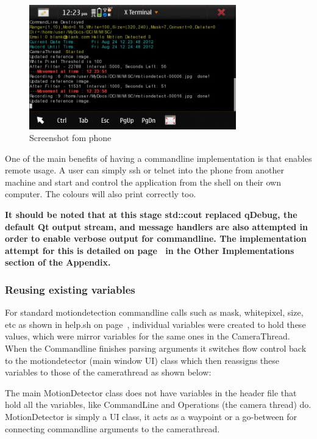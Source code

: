 {\begin{figure}[H]
	\vspace{-10pt}
	\begin{center}
		\includegraphics[width=0.8\textwidth]{../images/commandline/commandscreen.jpg}
	\end{center}
	\vspace{-20pt}
	\caption{Screenshot fom phone}
	\label{img:command}
	\vspace{-10pt}
\end{figure}

One of the main benefits of having a commandline implementation is that enables remote usage. A user can simply ssh or telnet into the phone from another machine and start and control the application from the shell on their own computer. The colours will also print correctly too.

{\small\bf It should be noted that at this stage std::cout replaced qDebug, the default Qt output stream, and message handlers are also attempted in order to enable verbose output for commandline. The implementation attempt for this is detailed on page~\pageref{qdebug} in the Other Implementations section of the Appendix.}

}
\subsubsection{Reusing existing variables}

For standard motiondetection commandline calls such as mask, whitepixel, size, etc as shown in help.sh on page~\pageref{frame:help}, individual variables were created to hold these values, which were mirror variables for the same ones in the CameraThread. When the Commandline finishes parsing arguments it switches flow control back to the motiondetector (main window UI) class which then reassigns these variables to those of the camerathread as shown below:
\begin{frame}{}

\end{frame}
The main MotionDetector class does not have variables in the header file that hold all the variables, like CommandLine and Operations (the camera thread) do. MotionDetector is simply a UI class, it acts as a waypoint or a go-between for connecting commandline arguments to the camerathread.

